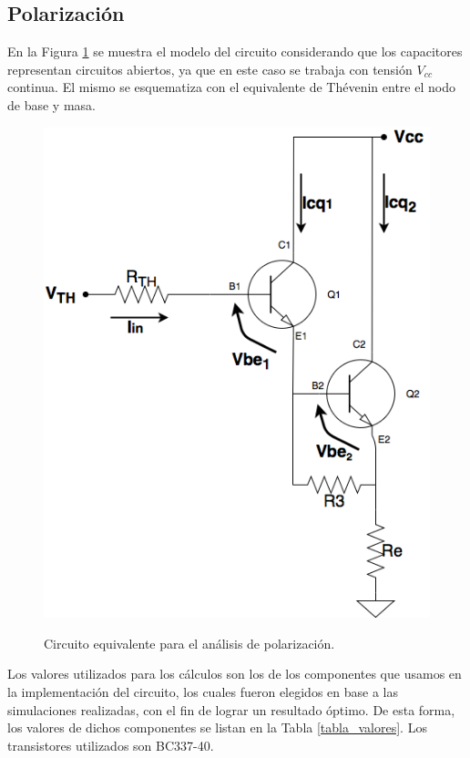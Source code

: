 	\subsection{Polarizaci\'on}
		En la Figura \ref{polarizacion} se muestra el modelo del circuito considerando que los capacitores representan circuitos abiertos, ya que en este caso se trabaja con tensión $V_{cc}$ continua. El mismo se esquematiza con el equivalente de Th\'evenin entre el nodo de base y masa.\\
		\begin{figure}[H]
			\centering
			\includegraphics[scale=0.4]{./Imagenes/polarizacion.png} \\
			\caption{Circuito equivalente para el an\'alisis de polarizaci\'on.}
			\label{polarizacion}
		\end{figure}

Los valores utilizados para los cálculos son los de los componentes que usamos en la implementación del circuito, los cuales fueron elegidos en base a las simulaciones realizadas, con el fin de lograr un resultado óptimo. De esta forma, los valores de dichos componentes se listan en la Tabla \ref{tabla_valores}. Los transistores utilizados son BC337-40.

